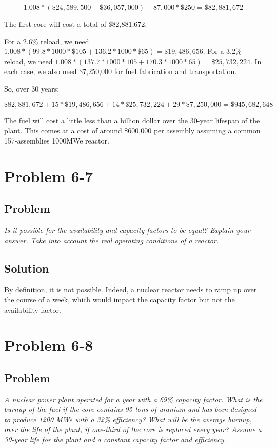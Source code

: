 \begin{equation}
1.008 * (\$24,589,500 + \$36,057,000) + 87,000 * \$250 = \$82,881,672
\end{equation}

The first core will cost a total of \$82,881,672.

For a 2.6\% reload, we need $1.008 * (99.8 * 1000 * \$105 + 136.2 * 1000 * \$65) = \$19,486,656$. For a 3.2\% reload, we need $1.008 * (137.7 * 1000 * 105 + 170.3 * 1000 * 65) = \$25,732,224$. In each case, we also need \$7,250,000 for fuel fabrication and transportation.

So, over 30 years:

\begin{equation}
\$82,881,672 + 15 * \$19,486,656 + 14 * \$25,732,224 + 29 * \$7,250,000 = \$945,682,648
\end{equation}

The fuel will cost a little less than a billion dollar over the 30-year lifespan of the plant. This comes at a cost of around \$600,000 per assembly assuming a common 157-assemblies 1000MWe reactor.


\section{Problem 6-7}
\label{prob67}


\subsection{Problem}
\textit{Is it possible for the availability and capacity factors to be equal? Explain your answer. Take into account the real operating conditions of a reactor.}

\subsection{Solution}

By definition, it is not possible. Indeed, a nuclear reactor needs to ramp up over the course of a week, which would impact the capacity factor but not the availability factor.


\section{Problem 6-8}
\label{prob68}


\subsection{Problem}
\textit{A nuclear power plant operated for a year with a 69\% capacity factor. What is the burnup of the fuel if the core contains 95 tons of uranium and has been designed to produce 1200 MWe with a 32\% efficiency? What will be the average burnup, over the life of the plant, if one-third of the core is replaced every year? Assume a 30-year life for the plant and a constant capacity factor and efficiency.}

